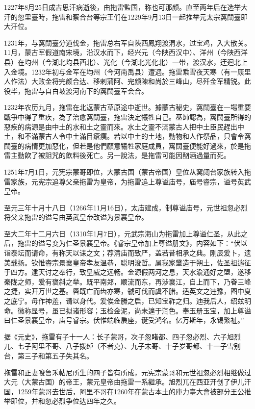 1227年8月25日成吉思汗病逝後，由拖雷監国，称也可那颜。直至两年后在选举大汗的忽里臺時，拖雷和察合台等宗王们在1229年9月13日一起推举元太宗窩闊臺即大汗位。

1231年，与窩闊臺分道伐金，拖雷总右军自陝西鳳翔渡渭水，过宝鸡，入大散关。11月，蒙古军假道南宋境，沿汉水而下，经兴元（今陕西汉中）、洋州（今陕西洋县）在均州（今湖北均县西北）、光化（今湖北光化北）一带，渡汉水，迂迴北上入金境。1232年初与金军在均州（今河南禹县）遭遇。拖雷乘雪夜天寒（有一康里人作法）大败金将完颜合达、移剌蒲阿、完颜陳和尚於三峰山，尽歼金军精锐。此役毕，拖雷与自白坡渡河南下的窩闊臺军会合。

1232年农历九月，拖雷在北返蒙古草原途中逝世。據蒙古秘史，窩闊臺在一場重要戰爭中得了重疾，為了治愈窩闊臺，拖雷決定犧牲自己。巫師認為，窩闊臺所得的惡疾的病源是由中土的水和土之靈而來。水土之靈不滿蒙古人把中土臣民趕出中土，和不滿蒙古人令中土滿目瘡痍。若以中土的土地，動物和人作祭品，只會令窩闊臺的病情更加惡化，但若是他們願意犧牲家庭成員，窩闊臺便能好過來，於是拖雷主動飮了被詛咒的飲料後死亡。另一說法，是拖雷可能因酗酒過量而死。

1251年7月1日，元宪宗蒙哥即位，大蒙古国（蒙古帝国）皇位从窝阔台家族转入拖雷家族，元宪宗追尊父亲拖雷为皇帝，为拖雷追上尊谥庙号，庙号睿宗，谥号英武皇帝。

至元三年十月十八日（1266年11月16日），太庙建成，制尊谥庙号，元世祖忽必烈将父亲拖雷的谥号由英武皇帝改谥为景襄皇帝。 

至大二年十二月六日（1310年1月7日），元武宗海山为拖雷加上尊谥仁圣，从此之后，拖雷的谥号变为仁圣景襄皇帝。《睿宗皇帝加上尊谥册文》，内容如下：“伏以诣泰坛而请命，有称天以诔之文；荐清庙而致严，盖若昔相承之典。刚辰爰卜，遗美载扬。钦惟睿宗景襄皇帝孝友温恭，聪明浚哲。属我家肈造于朔土，佐圣祖遄征于四方。逮天讨之奉行，致皇威之远畅。金源假两河之息，天水渝通好之盟，遂移秦陇之师，爰有褒斜之举。既平南郑，顺流而东，再涉襄江，自上而下，乃眷三峰之捷，实开万世之基。唇既亡而齿亦寒，虢可伐而虞不腊。适英文之违豫，图中夏之底宁。毋作神羞，请以身代。爰俟金縢之启，已知宝祚之归。迪我后人，绍兹明命。徽称显号，虽已拟诸形容；玉检金泥，尚未遑于润色。奉玉册玉宝，加上尊谥曰仁圣景襄皇帝，庙号睿宗。伏惟端临扆座，诞受鸿名。亿万斯年，永锡繁祉。”

据《元史》，拖雷有子十一人：长子蒙哥，次子忽睹都、四子忽必烈、六子旭烈兀、七子阿里不哥、八子拨绰（不者克）、九子末哥、十子岁哥都、十一子雪别台，第三子和第五子失其名。

拖雷和正妻唆鲁禾帖尼所生的四子皆有所成，元宪宗蒙哥和元世祖忽必烈相继做过大元（大蒙古国）的帝王，蒙元皇帝由拖雷一系繼承。旭烈兀在西亚开创了伊儿汗国，1259年蒙哥去世后，阿里不哥在1260年在蒙古本土的庫力臺大會被部分王公推举即位，并和忽必烈争位达四年之久。


